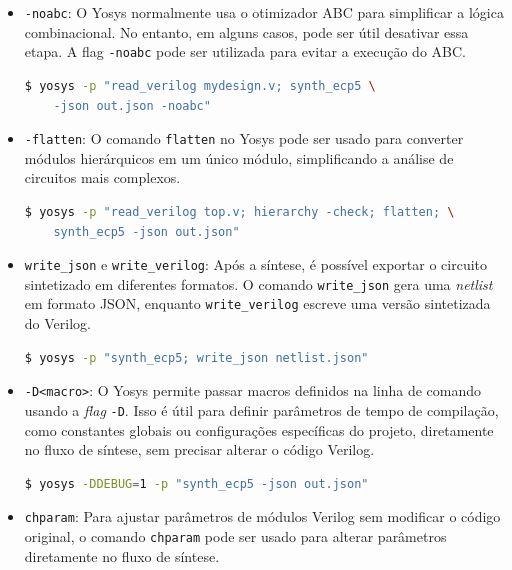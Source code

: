 \documentclass{report}
\begin{document}
\begin{itemize}
\item \texttt{-noabc}: O Yosys normalmente usa o otimizador ABC para simplificar a lógica combinacional. No entanto, em alguns casos, pode ser útil desativar essa etapa. A flag \texttt{-noabc} pode ser utilizada para evitar a execução do ABC.

\begin{lstlisting}[language=bash]
$ yosys -p "read_verilog mydesign.v; synth_ecp5 \
    -json out.json -noabc"
\end{lstlisting}

\item \texttt{-flatten}: O comando \texttt{flatten} no Yosys pode ser usado para converter módulos hierárquicos em um único módulo, simplificando a análise de circuitos mais complexos.

\begin{lstlisting}[language=bash]
$ yosys -p "read_verilog top.v; hierarchy -check; flatten; \
    synth_ecp5 -json out.json"
\end{lstlisting}

\item \texttt{write\_json} e \texttt{write\_verilog}: Após a síntese, é possível exportar o circuito sintetizado em diferentes formatos. O comando \texttt{write\_json} gera uma \textit{netlist} em formato JSON, enquanto \texttt{write\_verilog} escreve uma versão sintetizada do Verilog.

\begin{lstlisting}[language=bash]
$ yosys -p "synth_ecp5; write_json netlist.json"
\end{lstlisting}

\item \texttt{-D<macro>}: O Yosys permite passar macros definidos na linha de comando usando a \textit{flag} \texttt{-D}. Isso é útil para definir parâmetros de tempo de compilação, como constantes globais ou configurações específicas do projeto, diretamente no fluxo de síntese, sem precisar alterar o código Verilog.

\begin{lstlisting}[language=bash]
$ yosys -DDEBUG=1 -p "synth_ecp5 -json out.json"
\end{lstlisting}

\item \texttt{chparam}: Para ajustar parâmetros de módulos Verilog sem modificar o código original, o comando \texttt{chparam} pode ser usado para alterar parâmetros diretamente no fluxo de síntese.


\end{itemize}
\end{document}
